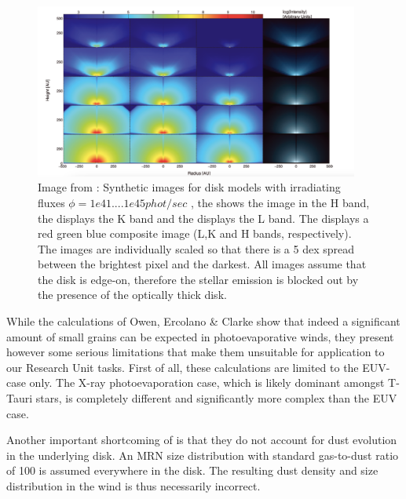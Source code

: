 \documentclass[10pt,fleqn,twoside]{article}
\begin{document}
\begin{figure}
  \includegraphics[width=0.95\textwidth]{wingnut.pdf}
  \caption{Image from \citet{2011MNRAS.411.1104O}: Synthetic images for
    disk models with irradiating fluxes $\phi = 1e41.... 1e45 phot/sec$ ,
    the  shows the image in the H band,
    the  displays the K band and the
     displays the L band. The
     displays a red green blue
    composite image (L,K and H bands, respectively). The images are
    individually scaled so that there is a 5 dex spread between the
    brightest pixel and the darkest. All images assume that the disk is
    edge-on, therefore the stellar emission is blocked out by the presence
    of the optically thick disk.}
  \label{fig:maps}
\end{figure}

While the calculations of Owen, Ercolano \& Clarke show that indeed a
significant amount of small grains can be expected in photoevaporative
winds, they present however
some serious limitations that make them unsuitable for application to our Research
Unit tasks. 
First of all, these calculations are limited to the EUV-case only. The
X-ray photoevaporation case, which is likely dominant amongst T-Tauri
stars, is completely different and significantly more complex than the EUV case. 

Another important shortcoming of \citet{2011MNRAS.411.1104O} is
that they do not account for dust evolution in the underlying disk. An
MRN \citep{1977ApJ...217..425M} size distribution with standard gas-to-dust ratio of 100 is
assumed everywhere in the disk. The resulting dust density and size
distribution in the wind is thus necessarily incorrect. 
\end{document}
